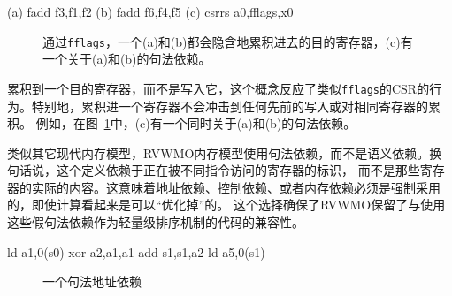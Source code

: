 \begin{verbbox}
(a) fadd  f3,f1,f2
(b) fadd  f6,f4,f5
(c) csrrs a0,fflags,x0
\end{verbbox}
\begin{figure}[h!]
  \centering\small
  \theverbbox
  \caption{通过{\tt fflags}，一个(a)和(b)都会隐含地累积进去的目的寄存器，(c)有一个关于(a)和(b)的句法依赖。
    }
  \label{fig:litmus:fflags}
\end{figure}

累积到一个目的寄存器，而不是写入它，这个概念反应了类似{\tt fflags}的CSR的行为。特别地，累积进一个寄存器不会冲击到任何先前的写入或对相同寄存器的累积。
例如，在图~\ref{fig:litmus:fflags}中，(c)有一个同时关于(a)和(b)的句法依赖。

类似其它现代内存模型，RVWMO内存模型使用句法依赖，而不是语义依赖。换句话说，这个定义依赖于正在被不同指令访问的寄存器的标识，
而不是那些寄存器的实际的内容。这意味着地址依赖、控制依赖、或者内存依赖必须是强制采用的，即使计算看起来是可以“优化掉”的。
这个选择确保了RVWMO保留了与使用这些假句法依赖作为轻量级排序机制的代码的兼容性。

\begin{verbbox}
ld  a1,0(s0)
xor a2,a1,a1
add s1,s1,a2
ld  a5,0(s1)
\end{verbbox}
\begin{figure}[h!]
  \centering\small
  \theverbbox
  \caption{一个句法地址依赖  
  }
  \label{fig:litmus:address}
\end{figure}

